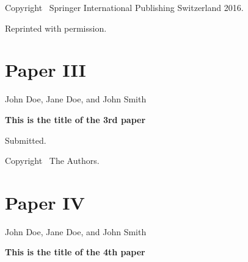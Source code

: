 \documentclass[officiallayout]{tktla}
\begin{document}
\vspace{60pt}
\noindent Copyright \textcopyright\ Springer International Publishing Switzerland 2016.

\noindent Reprinted with permission.

\cleardoublepage
%



\chapter*{Paper III}\thispagestyle{empty}


\vspace{80pt}
\noindent John Doe, Jane Doe, and John Smith

\vspace{10pt}
\noindent\textbf{This is the title of the 3rd paper}

\vspace{10pt}
\noindent Submitted.

\vspace{60pt}
\noindent
Copyright \textcopyright\ The Authors.

\cleardoublepage
%





\chapter*{Paper IV}\thispagestyle{empty}


\vspace{80pt}
\noindent John Doe, Jane Doe, and John Smith

\vspace{10pt}
\noindent\textbf{This is the title of the 4th paper}
\end{document}
